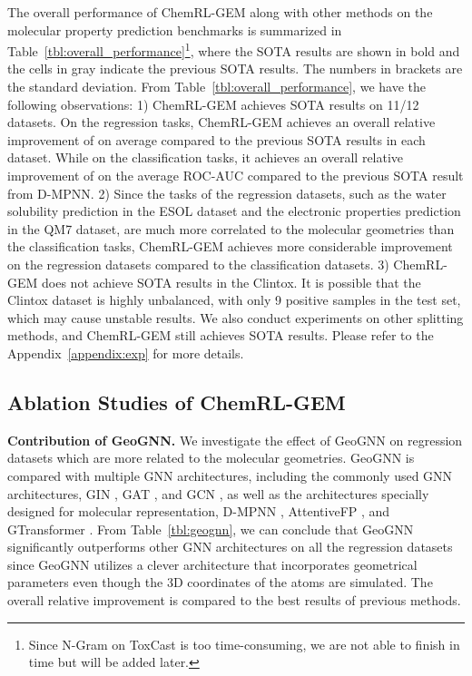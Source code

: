 \documentclass{article}
\begin{document}
The overall performance of ChemRL-GEM along with other methods on the molecular property prediction benchmarks is summarized in Table~\ref{tbl:overall_performance}\footnote{Since N-Gram on ToxCast is too time-consuming, we are not able to finish in time but will be added later.}, where the SOTA results are shown in bold and the cells in gray indicate the previous SOTA results. The numbers in brackets are the standard deviation. From Table~\ref{tbl:overall_performance}, we have the following observations:
1) ChemRL-GEM achieves SOTA results on 11/12 datasets. On the regression tasks, ChemRL-GEM achieves an overall relative improvement of  on average compared to the previous SOTA results in each dataset. While on the classification tasks, it achieves an overall relative improvement of  on the average ROC-AUC compared to the previous SOTA result from D-MPNN. 2) Since the tasks of the regression datasets, such as the water solubility prediction in the ESOL dataset and the electronic properties prediction in the QM7 dataset, are much more correlated to the molecular geometries than the classification tasks, ChemRL-GEM achieves more considerable improvement on the regression datasets compared to the classification datasets. 3) ChemRL-GEM does not achieve SOTA results in the Clintox. It is possible that the Clintox dataset is highly unbalanced, with only 9 positive samples in the test set, which may cause unstable results. We also conduct experiments on other splitting methods, and ChemRL-GEM still achieves SOTA results. Please refer to the Appendix~\ref{appendix:exp} for more details.




\subsection{Ablation Studies of ChemRL-GEM}
\textbf{Contribution of GeoGNN.}
We investigate the effect of GeoGNN on regression datasets which are more related to the molecular geometries. GeoGNN is compared with multiple GNN architectures, including the commonly used GNN architectures, GIN \cite{DBLP:conf/iclr/XuHLJ19}, GAT \cite{DBLP:journals/corr/abs-1710-10903}, and GCN \cite{DBLP:journals/corr/KipfW16}, as well as the architectures specially designed for molecular representation, D-MPNN \cite{doi:10.1021/acs.jcim.9b00237}, AttentiveFP \cite{doi:10.1021/acs.jmedchem.9b00959}, and GTransformer \cite{DBLP:conf/nips/RongBXX0HH20}. From Table~\ref{tbl:geognn}, we can conclude that GeoGNN significantly outperforms other GNN architectures on all the regression datasets since GeoGNN utilizes a clever architecture that incorporates geometrical parameters even though the 3D coordinates of the atoms are simulated. The overall relative improvement is  compared to the best results of previous methods.
\end{document}
